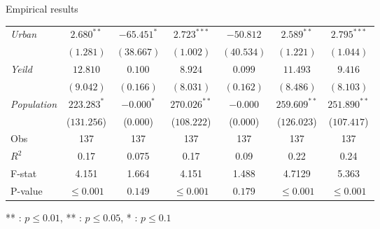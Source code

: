 \documentclass[10pt,aspectratio=169]{beamer}
\begin{document}
\begin{frame}{Empirical results}
\begin{table}[htbp]
\begin{threeparttable}
\begin{tabular}{lcccccc}
            \textit{Urban} & $2.680^{**}$ & $-65.451^{*}$ & $2.723^{***}$ & $-50.812$ & $2.589^{**}$ & $2.795^{***}$ \\
            & $(1.281)$ & $(38.667)$ & $(1.002)$ & $(40.534)$ & $(1.221)$ & $(1.044)$ \\
                   
            \textit{Yeild}  & $12.810$ & $0.100$ & $8.924$ & $0.099$ & $11.493$ & $ 9.416$ \\
            & $(9.042)$ & $(0.166)$ & $(8.031)$ & $(0.162)$ & $(8.486)$ &  $(8.103)$\\
            
            \textit{Population} & $223.283^{*}$ & $-0.000^{*}$ & $ 270.026^{**}$ & $-0.000$ & $259.609^{**}$ & $251.890^{**}$ \\
            & ($131.256$) & ($0.000$) & ($108.222$) & ($0.000$) & ($126.023$) & ($107.417$) \\
            
            \bottomrule
            Obs & 137 & 137 & 137 & 137 & 137 & 137 \\
            $R^{2}$ & 0.17 & 0.075 & 0.17 & 0.09 & 0.22 & 0.24 \\
            F-stat & 4.151 & 1.664 & 4.151 & 1.488 &  4.7129 & 5.363 \\
            P-value & $\leq 0.001$ & $0.149$ & $\leq 0.001$ & $0.179$ & $\leq 0.001$ & $\leq 0.001$ \\
            \bottomrule
            \bottomrule
        \end{tabular}        
    \begin{tablenotes}
        \item *** : $p\leq0.01$, ** : $p\leq0.05$, * : $p\leq0.1$
    \end{tablenotes}
    \end{threeparttable}
\end{table}
\end{frame}
\end{document}
